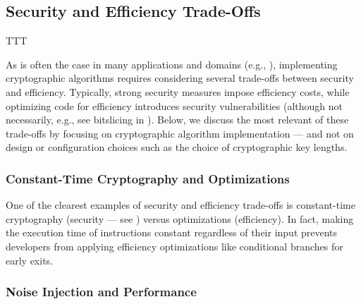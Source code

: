 \subsection{Security and Efficiency Trade-Offs}\label{sec:security_of_cryptographic_algorithms:trade_offs}

TTT


As is often the case in many applications and domains (e.g., \cite{centenaro_safety_2021,berlato_multi_2024}), implementing cryptographic algorithms requires considering several trade-offs between security and efficiency. Typically, strong security measures impose efficiency costs, while optimizing code for efficiency introduces security vulnerabilities (although not necessarily, e.g., see bitslicing in ). Below, we discuss the most relevant of these trade-offs by focusing on cryptographic algorithm implementation --- and not on design or configuration choices such as the choice of cryptographic key lengths.


\subsubsection{Constant-Time Cryptography and Optimizations}\label{sec:security_of_cryptographic_algorithms:trade_offs:constant_time_and_optimization}

One of the clearest examples of security and efficiency trade-offs is constant-time cryptography (security --- see ) versus optimizations (efficiency). In fact, making the execution time of instructions constant regardless of their input prevents developers from applying efficiency optimizations like conditional branches for early exits.


\subsubsection{Noise Injection and Performance}\label{sec:security_of_cryptographic_algorithms:trade_offs:noise_injection_and_performance}

